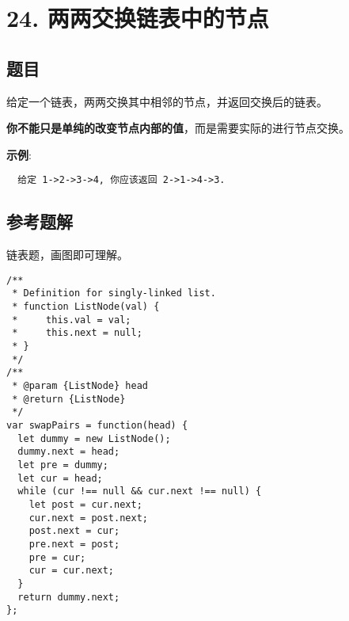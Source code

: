 \newpage
\section{24. 两两交换链表中的节点}
\label{leetcode:24}

\subsection{题目}

给定一个链表，两两交换其中相邻的节点，并返回交换后的链表。

\textbf{你不能只是单纯的改变节点内部的值}，而是需要实际的进行节点交换。

\textbf{示例}:

\begin{verbatim}
  给定 1->2->3->4, 你应该返回 2->1->4->3.
\end{verbatim}

\subsection{参考题解}

链表题，画图即可理解。

\begin{verbatim}
/**
 * Definition for singly-linked list.
 * function ListNode(val) {
 *     this.val = val;
 *     this.next = null;
 * }
 */
/**
 * @param {ListNode} head
 * @return {ListNode}
 */
var swapPairs = function(head) {
  let dummy = new ListNode();
  dummy.next = head;
  let pre = dummy;
  let cur = head;
  while (cur !== null && cur.next !== null) {
    let post = cur.next;
    cur.next = post.next;
    post.next = cur;
    pre.next = post;
    pre = cur;
    cur = cur.next;
  }
  return dummy.next;
};
\end{verbatim}
